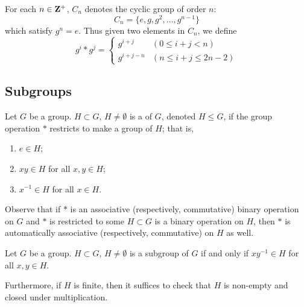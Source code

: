 \begin{notation}
For each $n\in\mathbf Z^+$, $C_n$ denotes the cyclic group of order $n$:
\[C_n=\{e,g,g^2,\dots,g^{n-1}\}\]
which satisfy $g^n=e$. Thus given two elements in $C_n$, we define
\[g^i\ast g^j=\begin{cases}
g^{i+j}&(0\le i+j<n)\\
g^{i+j-n}&(n\le i+j\le 2n-2)
\end{cases}\]
\end{notation}

\subsection{Subgroups}
\begin{definition}[Subgroup]
Let $G$ be a group. $H\subset G$, $H\neq\emptyset$ is a  of $G$, denoted $H\le G$, if the group operation $\ast$ restricts to make a group of $H$; that is,
\begin{enumerate}[label=(\roman*)]
\item $e\in H$;
\item $xy\in H$ for all $x,y\in H$;
\item $x^{-1}\in H$ for all $x\in H$.
\end{enumerate}
\end{definition}

\begin{remark}
Observe that if $\ast$ is an associative (respectively, commutative) binary operation on $G$ and $\ast$ is restricted to some $H\subset G$ is a binary operation on $H$, then $\ast$ is automatically associative (respectively, commutative) on $H$ as well.
\end{remark}

\begin{lemma}
Let $G$ be a group. $H\subset G$, $H\neq\emptyset$ is a subgroup of $G$ if and only if $xy^{-1}\in H$ for all $x,y\in H$. 

Furthermore, if $H$ is finite, then it suffices to check that $H$ is non-empty and closed under multiplication.
\end{lemma}

